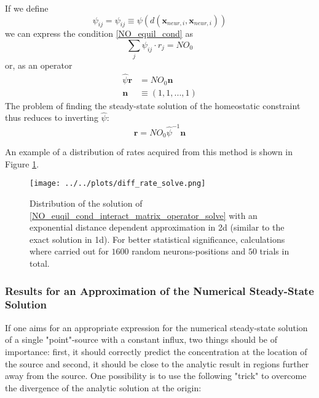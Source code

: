 \documentclass[10pt,a4paper]{article}
\begin{document}
If we define
\begin{equation}
\psi_{ij} = \psi_{ij} \equiv \psi (d(\mathbf{x}_{neur,i},\mathbf{x}_{neur,i}))
\label{interact_matrix_elements}
\end{equation}
we can express the condition \eqref{NO_equil_cond} as
\begin{equation}
\sum_j \psi_{ij}\cdot r_j = NO_0
\label{NO_equil_cond_interact_matrix}
\end{equation}
or, as an operator
\begin{align}
\hat{\psi}\mathbf{r} &= NO_0 \mathbf{n} \label{NO_equil_cond_interact_matrix_operator} \\
\mathbf{n}&\equiv (1,1,...,1)
\end{align}
The problem of finding the steady-state solution of the homeostatic constraint thus reduces to inverting $\hat{\psi}$:
\begin{equation}
\mathbf{r} = NO_0 \hat{\psi}^{-1} \mathbf{n}
\label{NO_euqil_cond_interact_matrix_operator_solve}
\end{equation}

An example of a distribution of rates acquired from this method is shown in Figure \ref{rate_dist_interact_matrix}.

\begin{figure}
\texttt{[image: ../../plots/diff\_rate\_solve.png]}
\caption{Distribution of the solution of \eqref{NO_euqil_cond_interact_matrix_operator_solve} with an exponential distance dependent approximation in 2d (similar to the exact solution in 1d). For better statistical significance, calculations where carried out for $1600$ random neurons-positions and $50$ trials in total.}
\label{rate_dist_interact_matrix}
\end{figure}

\subsubsection{Results for an Approximation of the Numerical Steady-State Solution}

If one aims for an appropriate expression for the numerical steady-state solution of a single "point"-source with a constant influx, two things should be of importance: first, it should correctly predict the concentration at the location of the source and second, it should be close to the analytic result in regions further away from the source. One possibility is to use the following "trick" to overcome the divergence of the analytic solution at the origin:
\end{document}

